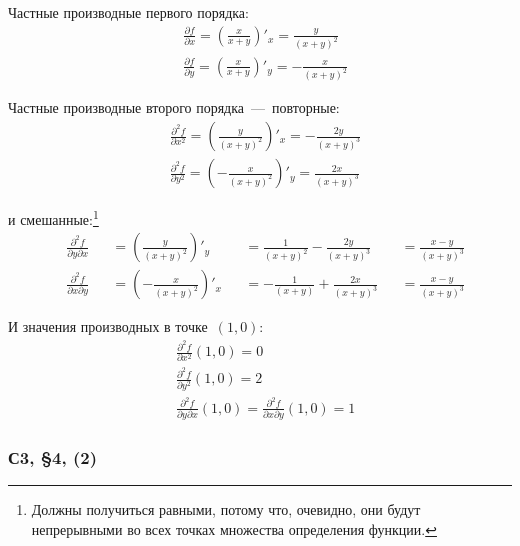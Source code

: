 \documentclass[a4paper,12pt]{article}
\begin{document}
  \begin{solution}
    Частные производные первого порядка:
    \[
      \begin{aligned}
        &\frac{\partial f}{\partial x} = \left(\frac{x}{x + y}\right)'_x = \frac{y}{(x + y)^2}\\
        &\frac{\partial f}{\partial y} = \left(\frac{x}{x + y}\right)'_y = -\frac{x}{(x + y)^2}
      \end{aligned}
    \]

    Частные производные второго порядка~---~повторные:
    \[
      \begin{aligned}
        &\frac{\partial^2 f}{\partial x^2} = \left(\frac{y}{(x + y)^2}\right)'_x = -\frac{2y}{(x + y)^3}\\
        &\frac{\partial^2 f}{\partial y^2} = \left(-\frac{x}{(x + y)^2}\right)'_y = \frac{2x}{(x + y)^3}
      \end{aligned}
    \]

    и смешанные:\footnote{
      Должны получиться равными, потому что, очевидно, они будут непрерывными во всех точках множества определения функции.
    }  %
    \[
      \begin{alignedat}{4}
        &\frac{\partial^2 f}{\partial y\partial x} & &= \left(\frac{y}{(x + y)^2}\right)'_y & &= \frac{1}{(x + y)^2} - \frac{2y}{(x + y)^3} & &= \frac{x - y}{(x + y)^3}\\
        &\frac{\partial^2 f}{\partial x \partial y} & &= \left(-\frac{x}{(x + y)^2}\right)'_x & &= -\frac{1}{(x + y)} + \frac{2x}{(x + y)^3} & &= \frac{x - y}{(x + y)^3}
      \end{alignedat}
    \]

    И значения производных в точке~$(1, 0)$:
    \[
      \begin{aligned}
        &\frac{\partial^2 f}{\partial x^2}(1, 0) = 0\\
        &\frac{\partial^2 f}{\partial y^2}(1, 0) = 2\\
        &\frac{\partial^2 f}{\partial y \partial x}(1, 0) = \frac{\partial^2 f}{\partial x \partial y}(1, 0) = 1
      \end{aligned}
    \]
  \end{solution}


  \subsubsection{С3, \S 4, (2)}\label{sec:s3-par4-15(2)}
\end{document}
